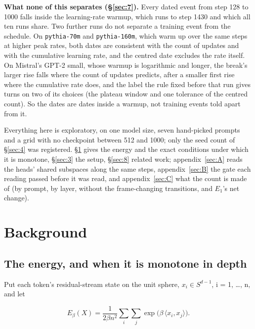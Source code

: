 \documentclass[11pt]{article}
\begin{document}
\textbf{What none of this separates (\S\ref{sec:7}).} Every dated event from step 128 to 1000 falls inside the learning-rate warmup, which runs to step 1430 and which all ten runs share. Two further runs do not separate a training event from the schedule. On \texttt{pythia-70m} and \texttt{pythia-160m}, which warm up over the same steps at higher peak rates, both dates are consistent with the count of updates and with the cumulative learning rate, and the centred date excludes the rate itself. On Mistral's GPT-2 small, whose warmup is logarithmic and longer, the break's larger rise falls where the count of updates predicts, after a smaller first rise where the cumulative rate does, and the label the rule fixed before that run gives turns on two of its choices (the plateau window and one tolerance of the centred count). So the dates are dates inside a warmup, not training events told apart from it.

Everything here is exploratory, on one model size, seven hand-picked prompts and a grid with no checkpoint between 512 and 1000; only the seed count of \S\ref{sec:4} was registered. \S\ref{sec:2} gives the energy and the exact conditions under which it is monotone, \S\ref{sec:3} the setup, \S\ref{sec:8} related work; appendix~\ref{sec:A} reads the heads' shared subspaces along the same steps, appendix~\ref{sec:B} the gate each reading passed before it was read, and appendix~\ref{sec:C} what the count is made of (by prompt, by layer, without the frame-changing transitions, and $E_{1}$'s net change).

\section{Background}\label{sec:2}

\subsection{The energy, and when it is monotone in depth}\label{sec:2.1}

Put each token's residual-stream state on the unit sphere, $x_{i} \in S^{d-1}$, i = 1, \dots{}, n, and let

\begin{equation}
E_\beta(X) = \frac{1}{2\beta n^2}\sum_{i}\sum_{j}\exp\bigl(\beta\,\langle x_i, x_j\rangle\bigr).
\end{equation}
\end{document}
